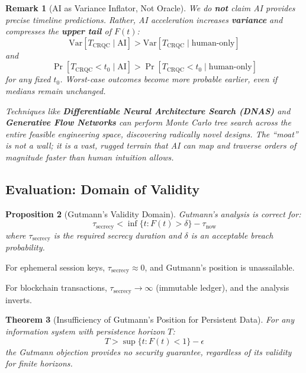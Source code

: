 \documentclass[11pt,a4paper]{article}
\newtheorem{theorem}{Theorem}[section]
\newtheorem{proposition}[theorem]{Proposition}
\newtheorem{remark}[theorem]{Remark}
\begin{document}
\begin{remark}[AI as Variance Inflator, Not Oracle]
We do \textbf{not} claim AI provides precise timeline predictions. Rather, AI acceleration increases \textbf{variance} and compresses the \textbf{upper tail} of $F(t)$:
\begin{equation}
\text{Var}[T_{\text{CRQC}} \mid \text{AI}] > \text{Var}[T_{\text{CRQC}} \mid \text{human-only}]
\end{equation}
and
\begin{equation}
\Pr[T_{\text{CRQC}} < t_0 \mid \text{AI}] > \Pr[T_{\text{CRQC}} < t_0 \mid \text{human-only}]
\end{equation}
for any fixed $t_0$. Worst-case outcomes become more probable earlier, even if medians remain unchanged.

Techniques like \textbf{Differentiable Neural Architecture Search (DNAS)} and \textbf{Generative Flow Networks} can perform Monte Carlo tree search across the entire feasible engineering space, discovering radically novel designs. The ``moat'' is not a wall; it is a vast, rugged terrain that AI can map and traverse orders of magnitude faster than human intuition allows.
\end{remark}

\subsection{Evaluation: Domain of Validity}

\begin{proposition}[Gutmann's Validity Domain]
Gutmann's analysis is correct for:
\begin{equation}
\tau_{\text{secrecy}} < \inf\{t : F(t) > \delta\} - \tau_{\text{now}}
\end{equation}
where $\tau_{\text{secrecy}}$ is the required secrecy duration and $\delta$ is an acceptable breach probability.
\end{proposition}

For ephemeral session keys, $\tau_{\text{secrecy}} \approx 0$, and Gutmann's position is unassailable.

For blockchain transactions, $\tau_{\text{secrecy}} \to \infty$ (immutable ledger), and the analysis inverts.

\begin{theorem}[Insufficiency of Gutmann's Position for Persistent Data]
For any information system with persistence horizon $T$:
\begin{equation}
T > \sup\{t : F(t) < 1\} - \epsilon
\end{equation}
the Gutmann objection provides no security guarantee, regardless of its validity for finite horizons.
\end{theorem}
\end{document}

